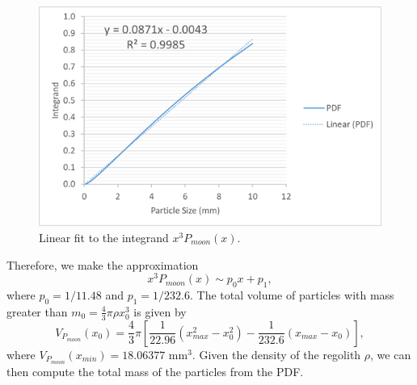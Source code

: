 \documentclass{hitec}
\begin{document}
\begin{figure}[h!]
	\centering
	\includegraphics[scale=0.7]{Fit-to-x3PDF.png}
	\caption{Linear fit to the integrand $x^3 P_{moon}(x)$.}\label{fig:Fit-to-x3PDF}
\end{figure}

Therefore, we make the approximation
\begin{equation}
x^3 P_{moon}(x) \sim p_0 x + p_1,
\end{equation}
where $p_0 = 1/11.48$ and $p_1 = 1/232.6$. The total volume of particles with mass greater than $m_{0} = \frac{4}{3}\pi\rho x_{0}^3$ is given by
\begin{equation}\label{eq:VPmoon2}
V_{P_{moon}}(x_{0}) = \frac{4}{3}\pi \left[\frac{1}{22.96}\left(x_{max}^2 - x_{0}^2\right) - \frac{1}{232.6}\left(x_{max} - x_{0}\right)\right],
\end{equation}
where $V_{P_{moon}}(x_{min}) = 18.06377$ mm$^3$. Given the density of the regolith $\rho$, we can then compute the total mass of the particles from the PDF.

\end{document}
